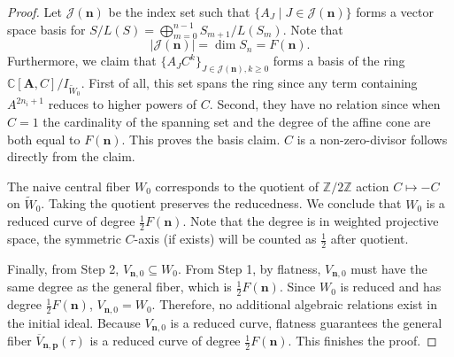 \documentclass[11pt]{amsart}
\theoremstyle{remark}
\numberwithin{equation}{section}
\begin{document}
\begin{proof}
Let $\mathcal{J}(\mathbf{n})$ be the index set such that $\{ A_J \mid J \in \mathcal{J}(\mathbf{n}) \}$ forms a vector space basis for $S/L(S) = \bigoplus_{m=0}^{n-1} S_{m+1}/L(S_m)$. Note that 
\[
| \mathcal{J}(\mathbf{n}) | = \dim S_n = F(\mathbf{n}).
\]
Furthermore, we claim that $\{ A_J C^k \}_{J \in \mathcal{J(\mathbf{n})}, k \geq 0}$ forms a basis of the ring $\mathbb{C}[\mathbf{A},C]/ I_{\widetilde{W}_0}$. First of all, this set spans the ring since any term containing $A^{2n_i+1}$ reduces to higher powers of $C$. Second, they have no relation since when $C=1$ the cardinality of the spanning set and the degree of the affine cone are both equal to $F(\mathbf{n})$. This proves the basis claim. $C$ is a non-zero-divisor follows directly from the claim. 

The naive central fiber $W_0$ corresponds to the quotient of $\mathbb{Z}/2\mathbb{Z}$ action $C \mapsto -C$ on $\widetilde{W}_0$. Taking the quotient preserves the reducedness. We conclude that $W_0$ is a reduced curve of degree $\frac{1}{2} F(\mathbf{n})$. Note that the degree is in weighted projective space, the symmetric $C$-axis (if exists) will be counted as $\frac{1}{2}$ after quotient.

Finally, from Step 2, $V_{\mathbf{n},0} \subseteq W_0$. From Step 1, by flatness, $V_{\mathbf{n},0}$ must have the same degree as the general fiber, which is $\tfrac{1}{2} F(\mathbf{n})$. Since $W_0$ is reduced and has degree $\tfrac{1}{2} F(\mathbf{n})$, $V_{\mathbf{n},0} = W_0$. Therefore, no additional algebraic relations exist in the initial ideal. Because $V_{\mathbf{n},0}$ is a reduced curve, flatness guarantees the general fiber $\overline{V}_{\mathbf{n},\mathbf{p}}(\tau)$ is a reduced curve of degree $\frac{1}{2} F(\mathbf{n})$. This finishes the proof.
\end{proof}
\end{document}
